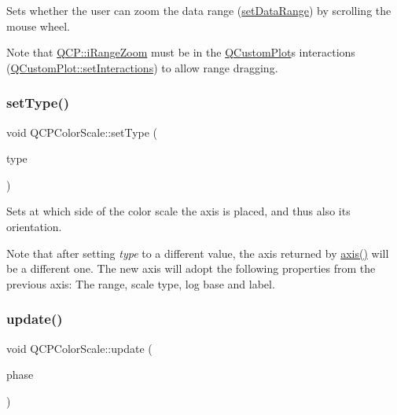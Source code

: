 Sets whether the user can zoom the data range (\mbox{\hyperlink{class_q_c_p_color_scale_abe88633003a26d1e756aa74984587fef}{set\+Data\+Range}}) by scrolling the mouse wheel.

Note that \mbox{\hyperlink{namespace_q_c_p_a2ad6bb6281c7c2d593d4277b44c2b037abee1e94353525a636aeaf0ba32b72e14}{Q\+C\+P\+::i\+Range\+Zoom}} must be in the \mbox{\hyperlink{class_q_custom_plot}{Q\+Custom\+Plot}}\textquotesingle{}s interactions (\mbox{\hyperlink{class_q_custom_plot_a5ee1e2f6ae27419deca53e75907c27e5}{Q\+Custom\+Plot\+::set\+Interactions}}) to allow range dragging. \mbox{\label{class_q_c_p_color_scale_a1bf9bdb291927c422dd66b404b206f1f}} 
\subsubsection{\texorpdfstring{set\+Type()}{setType()}}
{\footnotesize\ttfamily void Q\+C\+P\+Color\+Scale\+::set\+Type (\begin{DoxyParamCaption}\item[{\mbox{\hyperlink{class_q_c_p_axis_ae2bcc1728b382f10f064612b368bc18a}{Q\+C\+P\+Axis\+::\+Axis\+Type}}}]{type }\end{DoxyParamCaption})}

Sets at which side of the color scale the axis is placed, and thus also its orientation.

Note that after setting {\itshape type} to a different value, the axis returned by \mbox{\hyperlink{class_q_c_p_color_scale_a39bdbdb3b212602a5a57f9f3ea444190}{axis()}} will be a different one. The new axis will adopt the following properties from the previous axis\+: The range, scale type, log base and label. \mbox{\label{class_q_c_p_color_scale_ab8f6991ac88243fc582b44b183670334}} 
\subsubsection{\texorpdfstring{update()}{update()}}
{\footnotesize\ttfamily void Q\+C\+P\+Color\+Scale\+::update (\begin{DoxyParamCaption}\item[{\mbox{\hyperlink{class_q_c_p_layout_element_a0d83360e05735735aaf6d7983c56374d}{Update\+Phase}}}]{phase }\end{DoxyParamCaption})\hspace{0.3cm}{\ttfamily [virtual]}}

